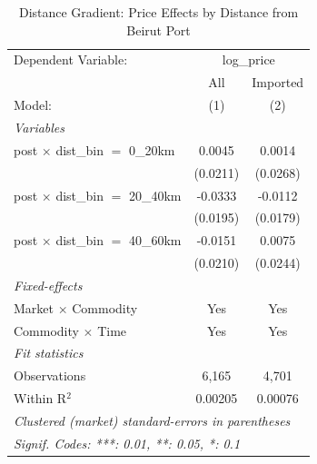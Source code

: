 
\begin{table}[htbp]
   \caption{\label{tab:distance} Distance Gradient: Price Effects by Distance from Beirut Port}
   \centering
   \begin{tabular}{lcc}
      \tabularnewline \midrule \midrule
      Dependent Variable: & \multicolumn{2}{c}{log\_price}\\
                                              & All      & Imported \\   
      Model:                                  & (1)      & (2)\\  
      \midrule
      \emph{Variables}\\
      post $\times$ dist\_bin $=$ 0\_20km     & 0.0045   & 0.0014\\   
                                              & (0.0211) & (0.0268)\\   
      post $\times$ dist\_bin $=$ 20\_40km    & -0.0333  & -0.0112\\   
                                              & (0.0195) & (0.0179)\\   
      post $\times$ dist\_bin $=$ 40\_60km    & -0.0151  & 0.0075\\   
                                              & (0.0210) & (0.0244)\\   
      \midrule
      \emph{Fixed-effects}\\
      Market $\times$ Commodity               & Yes      & Yes\\  
      Commodity $\times$ Time                 & Yes      & Yes\\  
      \midrule
      \emph{Fit statistics}\\
      Observations                            & 6,165    & 4,701\\  
      Within R$^2$                            & 0.00205  & 0.00076\\  
      \midrule \midrule
      \multicolumn{3}{l}{\emph{Clustered (market) standard-errors in parentheses}}\\
      \multicolumn{3}{l}{\emph{Signif. Codes: ***: 0.01, **: 0.05, *: 0.1}}\\
   \end{tabular}
\end{table}


